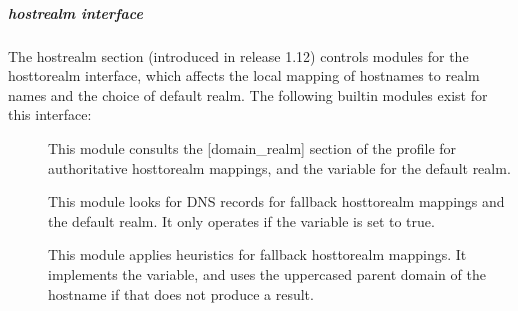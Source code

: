 \documentclass[letterpaper,10pt,english]{sphinxmanual}
\begin{document}
\subparagraph{hostrealm interface}
\label{\detokenize{admin/conf_files/krb5_conf:hostrealm-interface}}\label{\detokenize{admin/conf_files/krb5_conf:hostrealm}}
\sphinxAtStartPar
The hostrealm section (introduced in release 1.12) controls modules
for the host\sphinxhyphen{}to\sphinxhyphen{}realm interface, which affects the local mapping of
hostnames to realm names and the choice of default realm.  The following
built\sphinxhyphen{}in modules exist for this interface:
\begin{description}
\item[{}] \leavevmode
\sphinxAtStartPar
This module consults the {[}domain\_realm{]} section of the profile for
authoritative host\sphinxhyphen{}to\sphinxhyphen{}realm mappings, and the 
variable for the default realm.

\item[{}] \leavevmode
\sphinxAtStartPar
This module looks for DNS records for fallback host\sphinxhyphen{}to\sphinxhyphen{}realm
mappings and the default realm.  It only operates if the
 variable is set to true.

\item[{}] \leavevmode
\sphinxAtStartPar
This module applies heuristics for fallback host\sphinxhyphen{}to\sphinxhyphen{}realm
mappings.  It implements the  variable, and
uses the uppercased parent domain of the hostname if that does not
produce a result.

\end{description}
\end{document}
